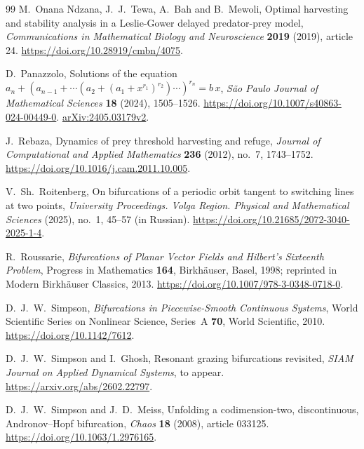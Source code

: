 \begin{thebibliography}{99}
M.~Onana Ndzana, J.~J.~Tewa, A.~Bah and B.~Mewoli,
Optimal harvesting and stability analysis in a Leslie-Gower delayed
predator-prey model,
\emph{Communications in Mathematical Biology and Neuroscience}
\textbf{2019} (2019), article 24.
\url{https://doi.org/10.28919/cmbn/4075}.

D.~Panazzolo,
Solutions of the equation
$a_n+(a_{n-1}+\cdots(a_2+(a_1+x^{r_1})^{r_2})\cdots)^{r_n}=b\,x$,
\emph{S\~ao Paulo Journal of Mathematical Sciences}
\textbf{18} (2024), 1505--1526.
\url{https://doi.org/10.1007/s40863-024-00449-0}.
\href{https://arxiv.org/abs/2405.03179v2}{arXiv:2405.03179v2}.

J.~Rebaza,
Dynamics of prey threshold harvesting and refuge,
\emph{Journal of Computational and Applied Mathematics} \textbf{236} (2012),
no.~7, 1743--1752.
\url{https://doi.org/10.1016/j.cam.2011.10.005}.

V.~Sh.~Roitenberg,
On bifurcations of a periodic orbit tangent to switching lines at two points,
\emph{University Proceedings. Volga Region. Physical and Mathematical
Sciences} (2025), no.~1, 45--57 (in Russian).
\url{https://doi.org/10.21685/2072-3040-2025-1-4}.

R.~Roussarie,
\emph{Bifurcations of Planar Vector Fields and Hilbert's Sixteenth Problem},
Progress in Mathematics \textbf{164}, Birkh\"auser, Basel, 1998;
reprinted in Modern Birkh\"auser Classics, 2013.
\url{https://doi.org/10.1007/978-3-0348-0718-0}.

D.~J.~W.~Simpson,
\emph{Bifurcations in Piecewise-Smooth Continuous Systems},
World Scientific Series on Nonlinear Science, Series~A \textbf{70},
World Scientific, 2010.
\url{https://doi.org/10.1142/7612}.

D.~J.~W.~Simpson and I.~Ghosh,
Resonant grazing bifurcations revisited,
\emph{SIAM Journal on Applied Dynamical Systems}, to appear.
\url{https://arxiv.org/abs/2602.22797}.

D.~J.~W.~Simpson and J.~D.~Meiss,
Unfolding a codimension-two, discontinuous, Andronov--Hopf bifurcation,
\emph{Chaos} \textbf{18} (2008), article 033125.
\url{https://doi.org/10.1063/1.2976165}.

\end{thebibliography}

